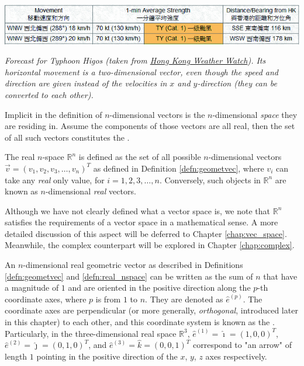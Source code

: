 \begin{table}[ht!]
    \centering
    \includegraphics[scale = 0.5]{higos.jpg}
    \caption{\textit{Forecast for Typhoon Higos (taken from \href{http://www.hkww.org/weather/tcarchive.html}{Hong Kong Weather Watch}). Its horizontal movement is a two-dimensional vector, even though the speed and direction are given instead of the velocities in $x$ and $y$-direction (they can be converted to each other).}}
\end{table}
Implicit in the definition of $n$-dimensional vectors is the $n$-dimensional \textit{space} they are residing in. Assume the components of those vectors are all real, then the set of all such vectors constitutes the .
\begin{defn}
\label{defn:real_nspace}
The real $n$-space $\mathbb{R}^n$ is defined as the set of all possible $n$-dimensional vectors $\vec{v} = (v_1, v_2, v_3, \ldots, v_n)^T$ as defined in Definition \ref{defn:geometvec}, where $v_i$ can take any \textit{real} only value, for $i = 1,2,3,\ldots,n$. Conversely, such objects in $\mathbb{R}^n$ are known as $n$-dimensional \textit{real} vectors.
\end{defn}
Although we have not clearly defined what a vector space is, we note that $\mathbb{R}^n$ satisfies the requirements of a vector space in a mathematical sense. A more detailed discussion of this aspect will be deferred to Chapter \ref{chap:vec_space}. Meanwhile, the complex counterpart will be explored in Chapter \ref{chap:complex}.\par
An $n$-dimensional real geometric vector as described in Definitions \ref{defn:geometvec} and \ref{defn:real_nspace} can be written as the sum of $n$  that have a magnitude of $1$ and are oriented in the positive direction along the $p$-th coordinate axes, where $p$ is from $1$ to $n$. They are denoted as $\hat{e}^{(p)}$. The coordinate axes are perpendicular (or more generally, \textit{orthogonal}, introduced later in this chapter) to each other, and this coordinate system is known as the . Particularly, in the three-dimensional real space $\mathbb{R}^3$, $\hat{e}^{(1)} = \hat{\imath} = (1,0,0)^T$, $\hat{e}^{(2)} = \hat{\jmath} = (0,1,0)^T$, and $\hat{e}^{(3)} = \hat{k} = (0,0,1)^T$ correspond to "an arrow" of length $1$ pointing in the positive direction of the $x$, $y$, $z$ axes respectively. 

